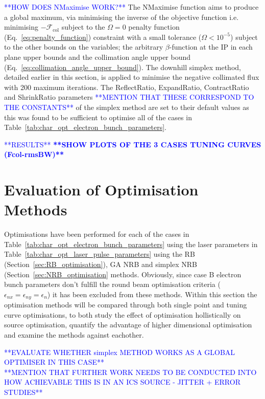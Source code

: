 \documentclass[../main.tex]{subfiles}
\begin{document}
\textcolor{blue}{**HOW DOES NMaximise WORK?**}
The NMaximise function aims to produce a global maximum, via minimising the inverse of the objective function i.e. minimising $-\mathcal{F}_{\mathrm{col}}$ subject to the $\Omega = 0$ penalty function (Eq.~\ref{eq:penalty_function}) constraint with a small tolerance ($\Omega < 10^{-5}$) subject to the other bounds on the variables; the arbitrary $\beta$-function at the IP in each plane upper bounds and the collimation angle upper bound (Eq.~\ref{eq:collimation_angle_upper_bound}). The downhill simplex method, detailed earlier in this section, is applied to minimise the negative collimated flux with 200 maximum iterations. The ReflectRatio, ExpandRatio, ContractRatio and ShrinkRatio parameters \textcolor{blue}{**MENTION THAT THESE CORRESPOND TO THE CONSTANTS**} \cite{wolfram2021nmaximize} of the simplex method are set to their default values as this was found to be sufficient to optimise all of the cases in Table~\ref{tab:char_opt_electron_bunch_parameters}.

\textcolor{blue}{**RESULTS**}
\textcolor{blue}{\textbf{**SHOW PLOTS OF THE 3 CASES TUNING CURVES (Fcol-rmsBW)**}}

\section{Evaluation of Optimisation Methods} 
\label{sec:evaluation_of_optimisation_methods}

Optimisations have been performed for each of the cases in Table~\ref{tab:char_opt_electron_bunch_parameters} using the laser parameters in Table~\ref{tab:char_opt_laser_pulse_parameters} using the RB (Section~\ref{sec:RB_optimisation}), GA NRB and simplex NRB (Section~\ref{sec:NRB_optimisation} methods. Obviously, since case B electron bunch parameters don't fulfill the round beam optimisation criteria ($\epsilon_{nx} = \epsilon_{ny} = \epsilon_{n}$) it has been excluded from these methods. Within this section the optimisation methods will be compared through both single point and tuning curve optimisations, to both study the effect of optimisation hollistically on source optimisation, quantify the advantage of higher dimensional optimisation and examine the methods against eachother.   

\textcolor{blue}{**EVALUATE WHETHER simplex METHOD WORKS AS A GLOBAL OPTIMISER IN THIS CASE** \\ **MENTION THAT FURTHER WORK NEEDS TO BE CONDUCTED INTO HOW ACHIEVABLE THIS IS IN AN ICS SOURCE - JITTER + ERROR STUDIES** \\}
\end{document}
